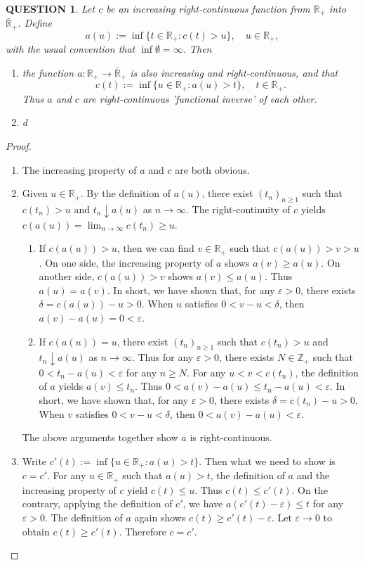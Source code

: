 \documentclass[12pt]{article}
\renewcommand{\(}{\left(}%
\renewcommand{\)}{\right)}%
\renewcommand{\[}{\left[}%
\renewcommand{\]}{\right]}%
\renewcommand{\r}{\mathbb{R}}
\newcommand{\z}{\mathbb{Z}}
\newtheorem{question}{QUESTION}[section]}
\newtheorem{proof}{Proof.}}
\begin{document}
  \begin{question}
  	Let $c$ be an increasing right-continuous function from $\r_+$ into $\bar{\r}_+$. Define
  	\begin{equation*}
  		a(u):=\inf\{t\in\r_+:c(t)>u\},\quad u\in\r_+,
  	\end{equation*}
  	with the usual convention that $\inf\emptyset=\infty$. Then
  	\begin{enumerate}
  		\item the function $a:\r_+\to \bar{\r}_+$ is also increasing and right-continuous, and that
  		\begin{equation*}
  			c(t):=\inf\{u\in\r_+:a(u)>t\},\quad t\in\r_+.
  		\end{equation*}
  		Thus $a$ and $c$ are right-continuous 'functional inverse' of each other.
  		\item d
  	\end{enumerate}
  \end{question}
  \begin{proof}
\begin{enumerate}
\item The increasing property of $a$ and $c$ are both obvious.
\item Given $u\in\r_+$. By the definition of $a(u)$, there exist $(t_n)_{n\geq 1}$ such that $c(t_n) >u$ and $t_n\downarrow a(u)$ as $n\to\infty$. The right-continuity of $c$ yields $c (a(u)) =\lim_{n\to\infty}c(t_n) \geq u$.
\begin{enumerate}
\item If $c (a(u)) >u$, then we can find $v\in\r_+$ such that $c(a(u)) >v>u$. On one side, the increasing property of $a$ shows $a(v) \geq a(u)$. On another side, $c(a(u)) >v$ shows $a(v) \leq a(u) $. Thus $a (u)=a(v)$. In short, we have shown that, for any $\varepsilon>0$, there exists $\delta=c(a(u))-u>0$. When $u$ satisfies $0<v-u<\delta$, then $a(v)-a (u) =0<\varepsilon$.
\item If $c(a(u)) =u$, there exist $(t_n)_{n\geq 1}$ such that $c(t_n)>u$ and $t_n\downarrow a(u)$ as $n\to\infty$. Thus for any $\varepsilon>0$, there exists $N\in\z_+$ such that $0<t_n-a (u) <\varepsilon$ for any $n\geq N$. For any $u<v<c(t_n)$, the definition of $a$ yields $a(v)\leq t_n$. Thus $0<a (v)-a(u) \leq t_n-a (u) <\varepsilon$. In short, we have shown that, for any $\varepsilon>0$, there exists $\delta=c(t_n)-u>0$. When $v$ satisfies $0<v-u<\delta$, then $0<a(v)-a(u)<\varepsilon$.
\end {enumerate}
The above arguments together show $a$ is right-continuous.
\item
Write $c' (t) :=\inf\{u\in\r_+:a(u)>t\}$. Then what we need to show is $c=c'$. For any $u\in\r_+$ such that $a(u) >t$, the definition of $a$ and the increasing property of $c$ yield $c(t) \leq u$. Thus $c(t) \leq c'(t)$. On the contrary, applying the definition of $c'$, we have $a(c'(t) -\varepsilon)\leq t$ for any $\varepsilon>0$. The definition of $a$ again shows $c(t) \geq c'(t)-\varepsilon$. Let $\varepsilon\to 0$ to obtain $c(t) \geq c'(t)$.
Therefore $c=c'$.
\end {enumerate}
\end{proof}
\end{document}
